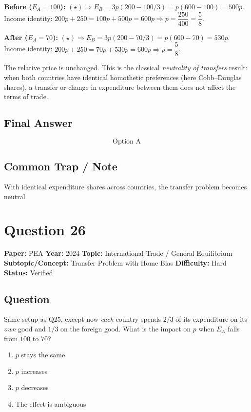 \documentclass[11pt]{article}
\begin{document}
\textbf{Before ($E_A=100$):} $(\star)\Rightarrow E_B=3p(200-100/3)=p(600-100)=500p$. Income identity: $200p+250=100p+500p=600p\Rightarrow p=\dfrac{250}{400}=\dfrac{5}{8}$.

\textbf{After ($E_A=70$):} $(\star)\Rightarrow E_B=3p(200-70/3)=p(600-70)=530p$. Income identity: $200p+250=70p+530p=600p\Rightarrow p=\dfrac{5}{8}$.

The relative price is unchanged. This is the classical \emph{neutrality of transfers} result: when both countries have identical homothetic preferences (here Cobb--Douglas shares), a transfer or change in expenditure between them does not affect the terms of trade.

\subsection*{Final Answer}
\[
\boxed{\text{Option A}}
\]

\subsection*{Common Trap / Note}
With identical expenditure shares across countries, the transfer problem becomes neutral.

\section*{Question 26}
\textbf{Paper:} PEA \quad \textbf{Year:} 2024 \quad \textbf{Topic:} International Trade / General Equilibrium \\
\textbf{Subtopic/Concept:} Transfer Problem with Home Bias \quad \textbf{Difficulty:} Hard \quad \textbf{Status:} Verified

\subsection*{Question}
Same setup as Q25, except now \emph{each} country spends $2/3$ of its expenditure on its \emph{own} good and $1/3$ on the foreign good. What is the impact on $p$ when $E_A$ falls from $100$ to $70$?
\begin{enumerate}[label=(\Alph*)]
\item $p$ stays the same
\item $p$ increases
\item $p$ decreases
\item The effect is ambiguous
\end{enumerate}
\end{document}
